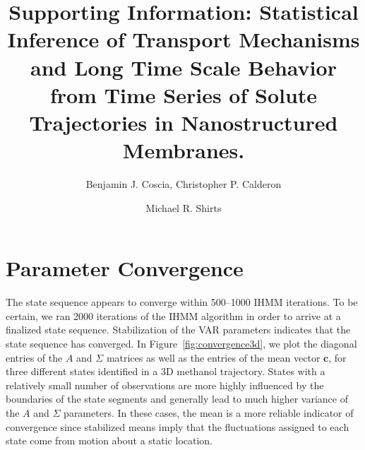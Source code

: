\documentclass{article}
\title{Supporting Information: Statistical Inference of Transport Mechanisms and Long Time Scale Behavior from Time Series 
       of Solute Trajectories in Nanostructured Membranes.}
\author{Benjamin J. Coscia, Christopher P. Calderon \and Michael R. Shirts}
\begin{document}
  \graphicspath{{./supporting_figures/}}
  \maketitle
  \tableofcontents
  
  \section{Parameter Convergence}\label{section:convergence}
  
  The state sequence appears to converge within 500--1000 IHMM iterations. To
  be certain, we ran 2000 iterations of the IHMM algorithm in order to arrive at a 
  finalized state sequence. Stabilization of the VAR parameters indicates 
  that the state sequence has converged. In Figure~\ref{fig:convergence3d}, we plot
  the diagonal entries of the $A$ and $\Sigma$ matrices as well as the entries of
  the mean vector $\mathbf{c}$, for three different states identified in a 3D 
  methanol trajectory. States with a relatively small number of observations are
  more highly influenced by the boundaries of the state segments and generally 
  lead to much higher variance of the $A$ and $\Sigma$ parameters. In these cases,
  the mean is a more reliable indicator of convergence since stabilized means 
  imply that the fluctuations assigned to each state come from motion about a 
  static location.
  
\end{document}
